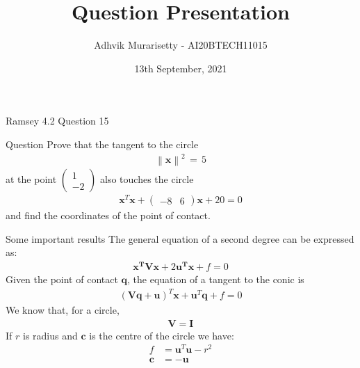 \documentclass{beamer}
\title{Question Presentation}
\author{Adhvik Murarisetty - AI20BTECH11015}
\date{13th September, 2021}
\newcommand\norm[1]{\left\lVert#1\right\rVert}
\renewcommand{\vec}[1]{\mathbf{#1}}
\providecommand{\brak}[1]{\ensuremath{\left(#1\right)}}
\theoremstyle{remark}
\providecommand{\norm}[1]{\lVert#1\rVert}
\newcommand{\myvec}[1]{\ensuremath{\begin{pmatrix}#1\end{pmatrix}}}
\numberwithin{equation}{subsection}
\let\vec\mathbf
\begin{document}
\begin{frame}
\titlepage
\end{frame}

\section{}
\begin{frame}{Ramsey 4.2 Question 15}
\begin{block}{Question}
Prove that the tangent to the circle 
\begin{align}
    \norm{\vec{x}}^2\,=\,5\label{0}
\end{align}
at the point \myvec{1\\-2} also touches the circle 
\begin{align}
    \vec{x}^T\vec{x}+\myvec{-8 & 6}\vec{x}+20 = 0\label{1}
\end{align}
and find the coordinates of the point of
contact.
\end{block}
\end{frame}

\begin{frame}
\begin{block}{Some important results}
The general equation of a second degree can be expressed as:
\begin{align}
\vec{x^T}\vec{V}\vec{x} + 2\vec{u^T}\vec{x} + f = 0 \label{2}
\end{align}
Given the point of contact $\vec{q}$, the equation of a tangent to the conic is 
\begin{align}
\brak{\vec{V}\vec{q}+\vec{u}}^T\vec{x}+\vec{u}^T\vec{q}+f = 0
\label{5}
\end{align}
We know that, for a circle, 
\begin{align}
\vec{V} = \vec{I}  
\end{align}
If $r$ is radius and $\vec{c}$ is the centre of the circle we have:
\begin{align}
f &=\vec{u}^T\vec{u}-r^2  \label{3} \\  
\vec{c} &=-\vec{u} \label{4}
\end{align}
\end{block}
\end{frame}
\end{document}
